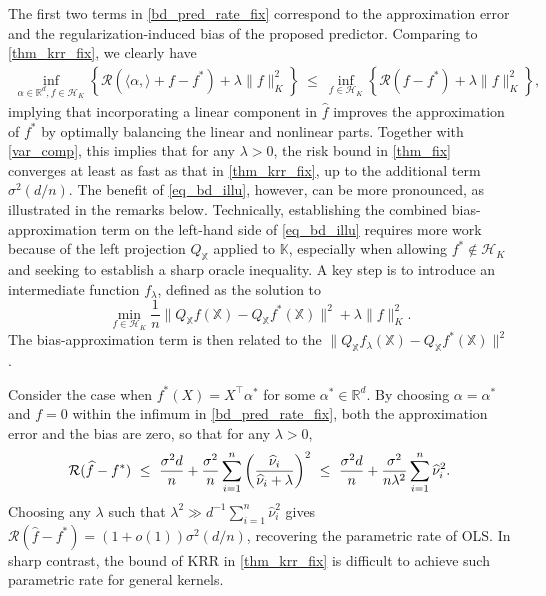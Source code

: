 \documentclass[11pt,twoside]{article}
\def\KK{\mathbb{K}}
\def\XX{\mathbb{X}}
\def\RR{\mathbb{R}}
\def\cH{\mathcal H}
\def\cR{\mathcal R}
\def\wh{\widehat}
\def\T{\top}
\begin{document}
The first two terms in \eqref{bd_pred_rate_fix} correspond to the approximation error and the regularization-induced bias of the proposed predictor. 
 Comparing to \cref{thm_krr_fix},  we clearly have  
\begin{align}\label{eq_bd_illu}
    \inf_{\alpha\in\RR^d, f\in \cH_K}\left\{   \cR(\langle \alpha,\rangle + f-f^*)    + \lambda\|f\|_K^2  \right\}  ~ \le ~  \inf_{f\in \cH_K}\left\{   \cR(f-f^*)    + \lambda\|f\|_K^2  \right\},  
\end{align}
implying that incorporating a linear component in $\wh f$ improves the approximation of $f^*$ by optimally balancing the linear and nonlinear parts. Together with \eqref{var_comp}, this implies that for any $\lambda>0$, the risk bound in \cref{thm_fix} converges at least as fast as that in \cref{thm_krr_fix}, up to the additional term $\sigma^2(d/n)$. The benefit of \eqref{eq_bd_illu}, however, can be more pronounced, as illustrated in the remarks below. Technically, establishing the combined bias-approximation term on the left-hand side of \eqref{eq_bd_illu} requires more work because of the left projection $Q_{\XX}$ applied to $\KK$, especially when allowing $f^* \notin \cH_K$ and seeking to establish a sharp oracle inequality.
A key step  is to introduce an intermediate function $f_\lambda$,   defined as the  solution to 
  \[
 \min_{f\in \cH_K} \frac{1}{n} \|Q_{\XX} f(\XX) -Q_{\XX}  f^*(\XX)\|^2  +\lambda\|f\|_K ^2.
  \]
  The bias-approximation term is then related to the $\|Q_{\XX} f_\lambda(\XX) - Q_{\XX} f^*(\XX)\|^2$.



 \begin{remark}\label{rem_comp_ols}
Consider the case when
$f^*(X) = X ^\T  \alpha^*$ for some $\alpha^*\in \RR^d$.  By choosing $\alpha= \alpha^*$ and $f =0 $ within the infimum in  \eqref{bd_pred_rate_fix}, both the approximation error and the bias are zero, so that for any $\lambda >0$,
\[
\cR(\wh f-f^*)
~ \le ~ {\sigma^2 d\over n}   + {\sigma^2 \over n}\sum_{i=1}^n\left(\wh\nu_i\over \wh\nu_i + \lambda\right)^2 ~\le~     {\sigma^2 d\over n} + {\sigma^2\over n \lambda^2}   \sum_{i=1}^n\wh\nu_i^2.
\] 
Choosing any  $\lambda$ such that $\lambda^2 \gg  d^{-1} \sum_{i=1}^n\wh\nu_i^2 $ gives
$\cR(\wh f-f^*) 
= (1+o(1)) \sigma^2 (d/n) $,
recovering the parametric rate of OLS.  In sharp contrast, the bound of KRR  in \cref{thm_krr_fix} is difficult to achieve such parametric rate for general kernels. 
\end{remark}
\end{document}
